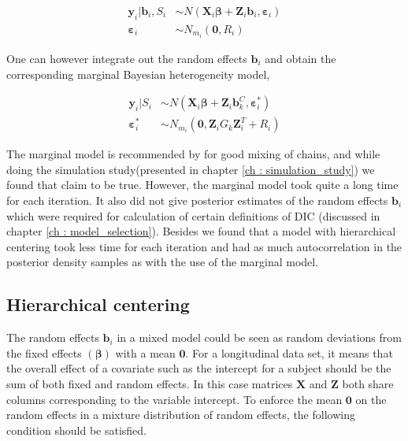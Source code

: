 \begin{equation}
\begin{split}
\boldsymbol{y}_i|\boldsymbol{b}_{i}, S_i &\sim N(\boldsymbol{X}_{i}\boldsymbol{\beta} + \boldsymbol{Z}_{i}\boldsymbol{b}_{i},\boldsymbol{\varepsilon}_{i})\\ 
\boldsymbol{\varepsilon}_{i} &\sim N_{m_i}(\boldsymbol{0}, R_i)
\end{split}
\end{equation}

One can however integrate out the random effects $\boldsymbol{b}_{i}$ and obtain the corresponding marginal Bayesian heterogeneity model,

\begin{equation}
\begin{split}
\boldsymbol{y}_i|S_i &\sim N(\boldsymbol{X}_{i}\boldsymbol{\beta} + \boldsymbol{Z}_{i}\boldsymbol{b}_k^C, \boldsymbol{\varepsilon}_{i}^*)\\ 
\boldsymbol{\varepsilon}_{i}^* &\sim N_{m_i}(\boldsymbol{0}, \boldsymbol{Z}_{i}G_k\boldsymbol{Z}_{i}^T+ R_i)
\end{split}
\end{equation}

The marginal model is recommended by \citet{fruhwirth-schnatter_bayesian_2004} for good mixing of chains, and while doing the simulation study(presented in chapter \ref{ch : simulation_study}) we found that claim to be true. However, the marginal model took quite a long time for each iteration. It also did not give posterior estimates of the random effects $\boldsymbol{b}_i$ which were required for calculation of certain definitions of DIC (discussed in chapter \ref{ch : model_selection}). Besides we found that a model with hierarchical centering took less time for each iteration and had as much autocorrelation in the posterior density samples as with the use of the marginal model.

\subsection{Hierarchical centering}
The random effects $\boldsymbol{b}_i$ in a mixed model could be seen as random deviations from the fixed effects $(\boldsymbol{\beta})$ with a mean $\boldsymbol{0}$. For a longitudinal data set, it means that the overall effect of a covariate such as the intercept for a subject should be the sum of both fixed and random effects. In this case matrices $\boldsymbol{X}$ and $\boldsymbol{Z}$ both share columns corresponding to the variable intercept. To enforce the mean $\boldsymbol{0}$ on the random effects in a mixture distribution of random effects, the following condition should be satisfied.

